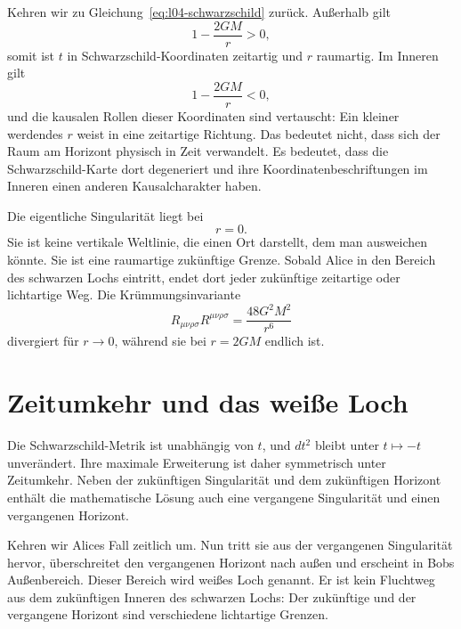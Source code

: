 Kehren wir zu Gleichung~\eqref{eq:l04-schwarzschild} zurück. Außerhalb gilt
\begin{equation}
1-\frac{2GM}{r}>0,
\end{equation}
somit ist \(t\) in Schwarzschild-Koordinaten zeitartig und \(r\) raumartig. Im Inneren gilt
\begin{equation}
1-\frac{2GM}{r}<0,
\end{equation}
und die kausalen Rollen dieser Koordinaten sind vertauscht: Ein kleiner werdendes \(r\) weist in eine zeitartige Richtung. Das bedeutet nicht, dass sich der Raum am Horizont physisch in Zeit verwandelt. Es bedeutet, dass die Schwarzschild-Karte dort degeneriert und ihre Koordinatenbeschriftungen im Inneren einen anderen Kausalcharakter haben.

Die eigentliche Singularität liegt bei
\begin{equation}
r=0.
\end{equation}
Sie ist keine vertikale Weltlinie, die einen Ort darstellt, dem man ausweichen könnte. Sie ist eine raumartige zukünftige Grenze. Sobald Alice in den Bereich des schwarzen Lochs eintritt, endet dort jeder zukünftige zeitartige oder lichtartige Weg. Die Krümmungsinvariante
\begin{equation}
R_{\mu\nu\rho\sigma}R^{\mu\nu\rho\sigma}
=\frac{48G^2M^2}{r^6}
\label{eq:l04-kretschmann}
\end{equation}
divergiert für \(r\to0\), während sie bei \(r=2GM\) endlich ist.

\section{Zeitumkehr und das weiße Loch}

Die Schwarzschild-Metrik ist unabhängig von \(t\), und \(dt^2\) bleibt unter \(t\mapsto-t\) unverändert. Ihre maximale Erweiterung ist daher symmetrisch unter Zeitumkehr. Neben der zukünftigen Singularität und dem zukünftigen Horizont enthält die mathematische Lösung auch eine vergangene Singularität und einen vergangenen Horizont.

Kehren wir Alices Fall zeitlich um. Nun tritt sie aus der vergangenen Singularität hervor, überschreitet den vergangenen Horizont nach außen und erscheint in Bobs Außenbereich. Dieser Bereich wird weißes Loch genannt. Er ist kein Fluchtweg aus dem zukünftigen Inneren des schwarzen Lochs: Der zukünftige und der vergangene Horizont sind verschiedene lichtartige Grenzen.

